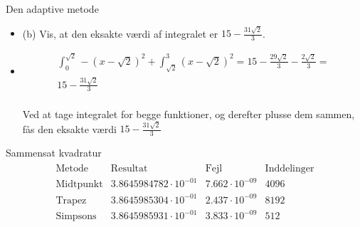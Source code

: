 \begin{frame}{Den adaptive metode}
    \begin{itemize}
        \item (b) Vis, at den eksakte værdi af integralet er $15-\frac{31\sqrt{2}}{3}$.
        \item \begin{align*}
            \int^{\sqrt{2}}_0-(x-\sqrt{2})^2+\int^3_{\sqrt{2}}(x-\sqrt{2})^2=15-\frac{29\sqrt{2}}{3}-\frac{2\sqrt{2}}{3}= \\ 15-\frac{31\sqrt{2}}{3} 
            \end{align*} \\
            Ved at tage integralet for begge funktioner, og derefter plusse dem sammen, fås den eksakte værdi $15-\frac{31\sqrt{2}}{3}$ \\
    \end{itemize}
\end{frame}



\begin{frame}{Sammensat kvadratur}
\begin{align*}
\begin{array}{l|c|c|c}
\text{Metode} & \text{Resultat}& \text{Fejl} &  \text{Inddelinger} \\
\hline
\text{Midtpunkt}	& 3.8645984782 \cdot 10^{-01} & 7.662 \cdot 10^{-09}	& 4096 \\
\text{Trapez}		& 3.8645985304 \cdot 10^{-01} & 2.437 \cdot 10^{-09} & 8192 \\
\text{Simpsons}		& 3.8645985931 \cdot 10^{-01} & 3.833 \cdot 10^{-09} & 512 \\
\end{array}
\end{align*}
\end{frame}

